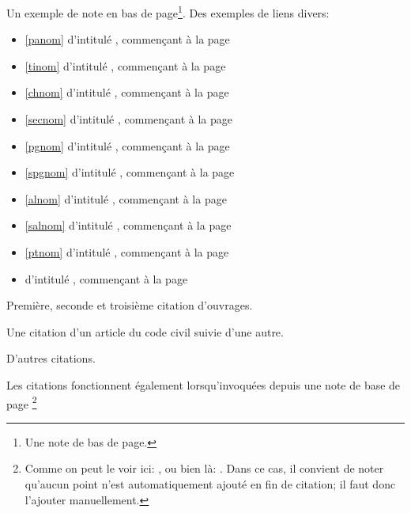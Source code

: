 
\label{liensinternes}
Un exemple de note en bas de page\footnote{Une note de bas de page.}. 
Des exemples de liens divers:
\begin{itemize}
\item \autoref{panom} d'intitulé , commençant à la page \pageref{panom} 
\item \autoref{tinom} d'intitulé , commençant à la page \pageref{tinom}
\item \autoref{chnom} d'intitulé , commençant à la page \pageref{chnom}
\item \ref{secnom} d'intitulé , commençant à la page \pageref{secnom}
\item \ref{pgnom} d'intitulé , commençant à la page \pageref{pgnom}
\item \ref{spgnom} d'intitulé , commençant à la page \pageref{spgnom}
\item \ref{alnom} d'intitulé , commençant à la page \pageref{alnom}
\item \ref{salnom} d'intitulé , commençant à la page \pageref{salnom}
\item \ref{ptnom} d'intitulé , commençant à la page \pageref{ptnom}
\item \no{\ref{monverset}} d'intitulé , commençant à la page \pageref{monverset}
\end{itemize}

Première\cite{cass_ass_19910531}, seconde\cite[35]{malaurie_obligations} et troisième citation\cite[39]{malaurie_obligations} d'ouvrages.

Une citation d'un article du code civil\cite[1642-1]{cciv} suivie d'une autre\cite[1642-2]{cciv}. 

D'autres citations\cites{saintpern_latexdroitfr}{alland_dicoculturejur}.

Les citations fonctionnent également lorsqu'invoquées depuis une note de base de page \footnote{Comme on peut le voir ici: \cites{egea_fonctionjuger}[35]{malaurie_obligations}, ou bien là: \cite{saintpern_latexdroitfr}. Dans ce cas, il convient de noter qu'aucun point n'est automatiquement ajouté en fin de citation; il faut donc l'ajouter manuellement.}

